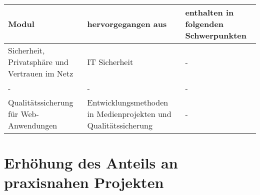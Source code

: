 \begin{longtable}[]{@{}lll@{}}
\toprule
\begin{minipage}[b]{0.33\columnwidth}\raggedright\strut
Modul\strut
\end{minipage} & \begin{minipage}[b]{0.33\columnwidth}\raggedright\strut
hervorgegangen aus\strut
\end{minipage} & \begin{minipage}[b]{0.33\columnwidth}\raggedright\strut
enthalten in folgenden Schwerpunkten\strut
\end{minipage}\tabularnewline
\midrule
\endhead
\begin{minipage}[t]{0.33\columnwidth}\raggedright\strut
Sicherheit, Privatsphäre und Vertrauen im Netz\strut
\end{minipage} & \begin{minipage}[t]{0.33\columnwidth}\raggedright\strut
IT Sicherheit\strut
\end{minipage} & \begin{minipage}[t]{0.33\columnwidth}\raggedright\strut
-\strut
\end{minipage}\tabularnewline
\begin{minipage}[t]{0.33\columnwidth}\raggedright\strut
-\strut
\end{minipage} & \begin{minipage}[t]{0.33\columnwidth}\raggedright\strut
-\strut
\end{minipage} & \begin{minipage}[t]{0.33\columnwidth}\raggedright\strut
-\strut
\end{minipage}\tabularnewline
\begin{minipage}[t]{0.33\columnwidth}\raggedright\strut
Qualitätssicherung für Web-Anwendungen\strut
\end{minipage} & \begin{minipage}[t]{0.33\columnwidth}\raggedright\strut
Entwicklungsmethoden in Medienprojekten und Qualitätssicherung\strut
\end{minipage} & \begin{minipage}[t]{0.33\columnwidth}\raggedright\strut
-\strut
\end{minipage}\tabularnewline
\bottomrule
\end{longtable}

\section{Erhöhung des Anteils an praxisnahen
Projekten}\label{erhuxf6hung-des-anteils-an-praxisnahen-projekten}

